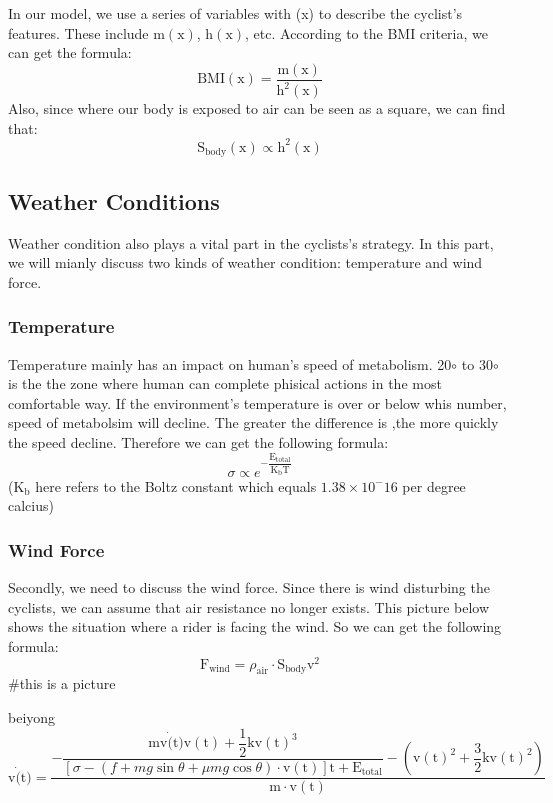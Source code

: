 \documentclass{article}
\begin{document}
	In our model, we use a series of variables with (x) to describe the cyclist's features. These include $\mathrm{m}(\mathrm{x})$, $\mathrm{h}(\mathrm{x})$, etc. According to the BMI criteria, we can get the formula:
	$$\mathrm{BMI}(\mathrm{x})=\dfrac{\mathrm{m}(\mathrm{x})}{\mathrm{h}^2(\mathrm{x})}$$
	Also, since where our body is exposed to air can be seen as a square, we can find that:
	$$\mathrm{S}_\mathrm{body}(\mathrm{x})\propto\mathrm{h}^2(\mathrm{x})$$
	\subsection{Weather Conditions}
	Weather condition also plays a vital part in the cyclists's strategy. In this part, we will mianly discuss two kinds of weather condition: temperature and wind force.
	\subsubsection{Temperature}
	Temperature mainly has an impact on human's speed of metabolism. 20$\circ$ to 30$\circ$ is the the zone where human can complete phisical actions in the most comfortable way. If the environment's temperature is over or below whis number, speed of metabolsim will decline. The greater the difference is ,the more quickly the speed decline. Therefore we can get the following formula:
	$$\sigma\propto e^{-\dfrac{\mathrm{E}_\mathrm{total}}{\mathrm{K}_\mathrm{b}\mathrm{T}}}$$
	($\mathrm{K}_\mathrm{b}$ here refers to the Boltz constant which equals $1.38\times10^-16$ per degree calcius)
	\subsubsection{Wind Force}
	Secondly, we need to discuss the wind force. Since there is wind disturbing the cyclists, we can assume that air resistance no longer exists. This picture below shows the situation where a rider is facing the wind. So we can get the following formula:
	$$\mathrm{F}_\mathrm{wind}=\rho_\mathrm{air}\cdot\mathrm{S}_\mathrm{body}\mathrm{v}^2$$
	\#this is a picture


	beiyong
	$$\mathrm{v}\dot(\mathrm{t})=\dfrac{-\dfrac{\mathrm{m}\mathrm{v}\dot(\mathrm{t})\mathrm{v}(\mathrm{t})+\dfrac{1}{2}\mathrm{k}{\mathrm{v}(\mathrm{t})}^3}{\left[\sigma-\left(f+mg \sin \theta+\mu mg \cos \theta\right)\cdot\mathrm{v}(\mathrm{t})\right]\mathrm{t}+\mathrm{E}_\mathrm{total}}-\left(\mathrm{v}(\mathrm{t})^2+\dfrac{3}{2}\mathrm{k}\mathrm{v}(\mathrm{t})^2\right)}{\mathrm{m}\cdot\mathrm{v}(\mathrm{t})}$$
\end{document}
